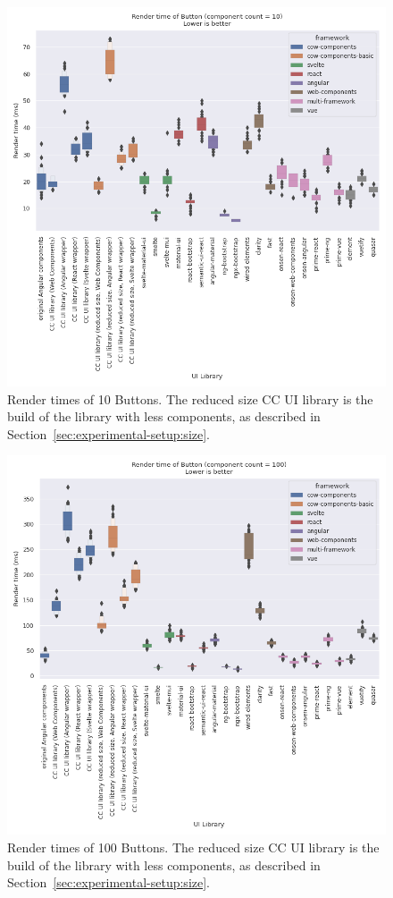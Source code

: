 \begin{figure}[htbp]
  \centering{}
  \includegraphics[width=0.8\columnwidth]{plots/render-time-all-10-Button.png}
  \caption{Render times of 10 Buttons. The reduced size CC UI library is the build of the library with less components, as described in Section~\ref{sec:experimental-setup:size}.}
  \label{fig:results:render-time-all-10}
  \centering
\end{figure}

\begin{figure}[htbp]
  \centering{}
  \includegraphics[width=0.8\columnwidth]{plots/render-time-all-100-Button.png}
  \caption{Render times of 100 Buttons. The reduced size CC UI library is the build of the library with less components, as described in Section~\ref{sec:experimental-setup:size}.}
  \label{fig:results:render-time-all-100}
  \centering
\end{figure}


